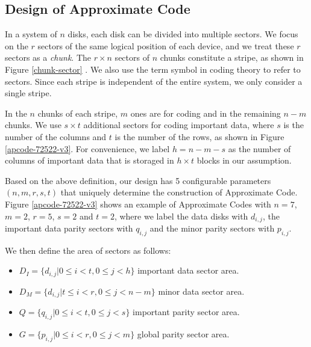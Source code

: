 \documentclass[sigconf]{acmart}
\begin{document}
\subsection{Design of Approximate Code}
In a system of $n$ disks, each disk can be divided into multiple sectors. We focus on the $r$ sectors of the same logical position of each device, and we treat these $r$ sectors as a \emph{chunk}. The $r \times n$ sectors of $n$ chunks constitute a stripe, as shown in Figure \ref{chunk-sector} . We also use the term symbol in coding theory to refer to sectors. Since each stripe is independent of the entire system, we only consider a single stripe.


In the $n$ chunks of each stripe, $m$ ones are for coding and in the remaining $n-m$ chunks. 
We use $s \times t$ additional sectors for coding important data, where $s$ is the number of the columns and $t$ is the number of the rows, as shown in Figure \ref{apcode-72522-v3}.
For convenience, we label $h=n-m-s$ as the number of columns of important data that is storaged in $h \times t$ blocks in our assumption.

Based on the above definition, our design has 5 configurable parameters $(n, m, r, s,t)$ that uniquely determine the construction of Approximate Code.
Figure \ref{apcode-72522-v3} shows an example of Approximate Codes with $n = 7$, $m = 2$, $r=5$, $s=2$ and $t = 2$, where we label the data disks with $d_{i,j}$, the important data parity sectors with $q_{i,j}$ and the minor parity sectors with $p_{i,j}$.

We then define the area of sectors as follows:
\begin{itemize}
    \item $D_I=\{d_{i,j}|0\leqslant i < t, 0\leqslant j < h \}$ important data sector area.
    \item $D_M=\{d_{i,j}|t\leqslant i < r, 0\leqslant j < n-m \}$ minor data sector area.
    \item $Q=\{q_{i,j}|0\leqslant i < t, 0\leqslant j < s \}$ important parity sector area. 
    \item $G=\{p_{i,j}|0\leqslant i < r, 0\leqslant j < m \}$ global parity sector area.
\end{itemize}
\end{document}
